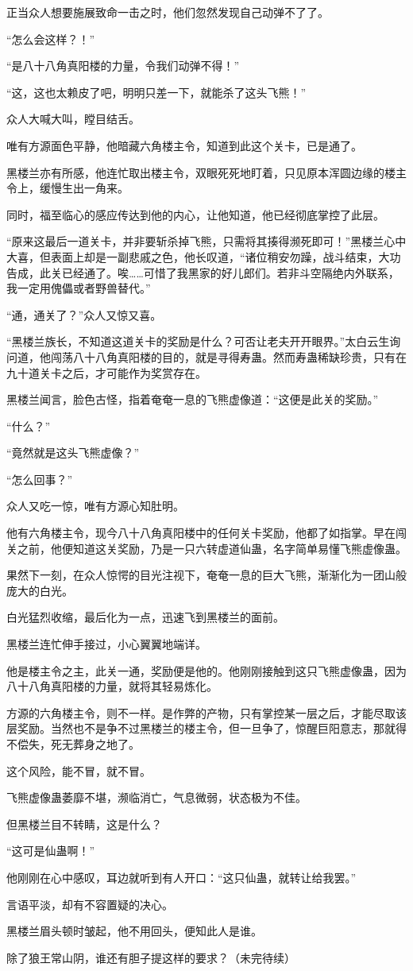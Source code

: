 \begin{this_body}
正当众人想要施展致命一击之时，他们忽然发现自己动弹不了了。

“怎么会这样？！”

“是八十八角真阳楼的力量，令我们动弹不得！”

“这，这也太赖皮了吧，明明只差一下，就能杀了这头飞熊！”

众人大喊大叫，瞠目结舌。

唯有方源面色平静，他暗藏六角楼主令，知道到此这个关卡，已是通了。

黑楼兰亦有所感，他连忙取出楼主令，双眼死死地盯着，只见原本浑圆边缘的楼主令上，缓慢生出一角来。

同时，福至临心的感应传达到他的内心，让他知道，他已经彻底掌控了此层。

“原来这最后一道关卡，并非要斩杀掉飞熊，只需将其揍得濒死即可！”黑楼兰心中大喜，但表面上却是一副悲戚之色，他长叹道，“诸位稍安勿躁，战斗结束，大功告成，此关已经通了。唉……可惜了我黑家的好儿郎们。若非斗空隔绝内外联系，我一定用傀儡或者野兽替代。”

“通，通关了？”众人又惊又喜。

“黑楼兰族长，不知道这道关卡的奖励是什么？可否让老夫开开眼界。”太白云生询问道，他闯荡八十八角真阳楼的目的，就是寻得寿蛊。然而寿蛊稀缺珍贵，只有在九十道关卡之后，才可能作为奖赏存在。

黑楼兰闻言，脸色古怪，指着奄奄一息的飞熊虚像道：“这便是此关的奖励。”

“什么？”

“竟然就是这头飞熊虚像？”

“怎么回事？”

众人又吃一惊，唯有方源心知肚明。

他有六角楼主令，现今八十八角真阳楼中的任何关卡奖励，他都了如指掌。早在闯关之前，他便知道这关奖励，乃是一只六转虚道仙蛊，名字简单易懂飞熊虚像蛊。

果然下一刻，在众人惊愕的目光注视下，奄奄一息的巨大飞熊，渐渐化为一团山般庞大的白光。

白光猛烈收缩，最后化为一点，迅速飞到黑楼兰的面前。

黑楼兰连忙伸手接过，小心翼翼地端详。

他是楼主令之主，此关一通，奖励便是他的。他刚刚接触到这只飞熊虚像蛊，因为八十八角真阳楼的力量，就将其轻易炼化。

方源的六角楼主令，则不一样。是作弊的产物，只有掌控某一层之后，才能尽取该层奖励。当然也不是争不过黑楼兰的楼主令，但一旦争了，惊醒巨阳意志，那就得不偿失，死无葬身之地了。

这个风险，能不冒，就不冒。

飞熊虚像蛊萎靡不堪，濒临消亡，气息微弱，状态极为不佳。

但黑楼兰目不转睛，这是什么？

“这可是仙蛊啊！”

他刚刚在心中感叹，耳边就听到有人开口：“这只仙蛊，就转让给我罢。”

言语平淡，却有不容置疑的决心。

黑楼兰眉头顿时皱起，他不用回头，便知此人是谁。

除了狼王常山阴，谁还有胆子提这样的要求？（未完待续）

\end{this_body}

